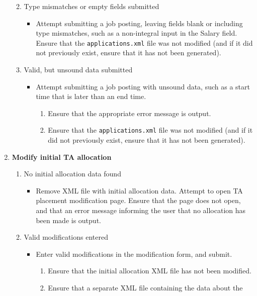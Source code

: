 \documentclass[12pt]{report}
\begin{document}
\begin{enumerate}
\begin{enumerate}
\begin{itemize}
				\end{itemize}
			\item Type mismatches or empty fields submitted
				\begin{itemize}
					\item Attempt submitting a job posting, leaving fields blank or including type
						mismatches, such as a non-integral input in the Salary field. Ensure that
						the \texttt{applications.xml} file was not modified (and if it did not
						previously exist, ensure that it has not been generated).
				\end{itemize}
			\item Valid, but unsound data submitted
				\begin{itemize}
					\item Attempt submitting a job posting with unsound data, such as a start time
						that is later than an end time.
						\begin{enumerate}
							\item Ensure that the appropriate error message is output.
							\item Ensure that the \texttt{applications.xml} file was not modified
								(and if it did not previously exist, ensure that it has not been
								generated).
						\end{enumerate}
				\end{itemize}
		\end{enumerate}
	\item \textbf{Modify initial TA allocation}
		\begin{enumerate}
			\item No initial allocation data found
				\begin{itemize}
					\item Remove XML file with initial allocation data. Attempt to open TA placement
						modification page. Ensure that the page does not open, and that an error
						message informing the user that no allocation has been made is output.
				\end{itemize}
			\item Valid modifications entered
				\begin{itemize}
					\item Enter valid modifications in the modification form, and submit.
						\begin{enumerate}
							\item Ensure that the initial allocation XML file has not been
								modified.
							\item Ensure that a separate XML file containing the data about the

\end{enumerate}
\end{itemize}
\end{enumerate}
\end{enumerate}
\end{document}
